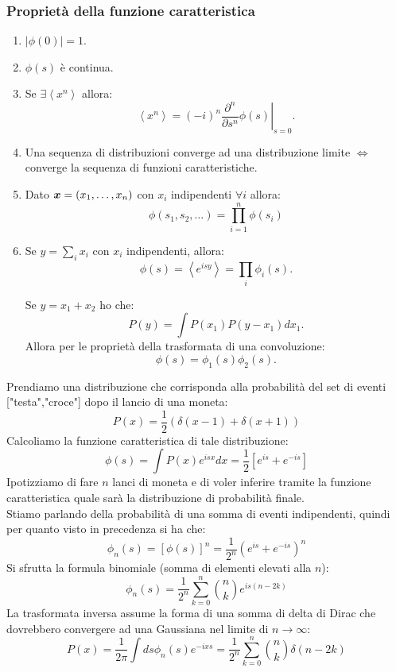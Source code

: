 \subsubsection{Proprietà della funzione caratteristica}%
\label{ssub:Proprietà della funzione caratteristica}
\begin{enumerate}
    \item $\left|\phi (0) \right|= 1 $.
    \item $\phi (s) $ è continua.
    \item Se $\exists \left<x^n\right>$ allora: 
	\[
		\left<x^n\right> = \left(-i\right)^n \left.\frac{\partial ^n}{\partial s^n} \phi (s)\right|_{s=0} 
	.\] 
    \item Una sequenza di distribuzioni converge ad una distribuzione limite $\iff$ converge la sequenza di funzioni caratteristiche.
    \item Dato $\boldsymbol{x} = \left(x_1, \ldots, x_n\right)$ con $x_i$ indipendenti $\forall i$ allora:
	\[ 
	    \phi (s_1, s_2, \ldots) = \prod_{i=1}^{n} \phi (s_i)  
	\]
    \item Se $y = \sum_{i}^{} x_i$ con $x_i$ indipendenti, allora:
	\[
	    \phi (s) = \left<e^{isy}\right> = \prod_{i}^{} \phi_i(s)  
	.\] 
	\begin{exmp}
	    Se $y = x_1 + x_2$ ho che:
	    \[
		P(y) = \int P(x_1) P(y-x_1) dx_1
	    .\] 
	    Allora per le proprietà della trasformata di una convoluzione:
	    \[
		\phi (s) = \phi_1(s) \phi_2(s) 
	    .\] 
	\end{exmp}
\end{enumerate}
\begin{exmp}
    Prendiamo una distribuzione che corrisponda alla probabilità del set di eventi ["testa","croce"] dopo il lancio di una moneta:
    \[
        P(x) = \frac{1}{2}\left( \delta(x-1) + \delta(x+1) \right) 
    \]
    Calcoliamo la funzione caratteristica di tale distribuzione:
    \[
	\phi(s) = \int P(x) e^{isx} dx = \frac{1}{2}\left[ e^{is} + e^{-is} \right] 
    \]
    Ipotizziamo di fare $n$ lanci di moneta e di voler inferire tramite la funzione caratteristica quale sarà la distribuzione di probabilità finale. \\
    Stiamo parlando della probabilità di una somma di eventi indipendenti, quindi per quanto visto in precedenza si ha che:
    \[
	\phi_n(s) = \left[ \phi(s) \right] ^n = \frac{1}{2^n} \left( e^{is} + e^{-is} \right)^n 
    \]
    Si sfrutta la formula binomiale (somma di elementi elevati alla $n$):
    \[
	\phi_n(s) = \frac{1}{2^n}\sum_{k = 0}^{n}\binom{n}{k} e^{is(n-2k)}
    \]
    La trasformata inversa assume la forma di una somma di delta di Dirac che dovrebbero convergere ad una Gaussiana nel limite di $n\to\infty$:
    \[
	P(x) = \frac{1}{2\pi}\int ds \phi_n(s) e^{-ixs} = \frac{1}{2^n} \sum_{k = 0}^{n} \binom{n}{k}\delta(n-2k)
    \]
\end{exmp}
